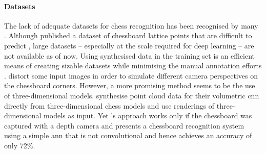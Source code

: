 \documentclass[../../main.tex]{subfiles}
\begin{document}
\paragraph{Datasets}
The lack of adequate datasets for chess recognition has been recognised by many \cite{czyzewski2020,ding2016,mehta2020}.
Although \textcite{czyzewski2020} published a dataset of chessboard lattice points that are difficult to predict \cite{czyzewski2018}, large datasets -- especially at the scale required for deep learning -- are not available as of now.
Using synthesised data in the training set is an efficient means of creating sizable datasets while minimising the manual annotation efforts \cite{wei2017,hou,czyzewski2020}.
\citeauthor{czyzewski2020} distort some input images in order to simulate different camera perspectives on the chessboard corners.
However, a more promising method seems to be the use of three-dimensional models.
\textcite{wei2017} synthesise point cloud data for their volumetric \gls{cnn} directly from three-dimensional chess models and \textcite{hou} use renderings of three-dimensional models as input. 
Yet \textcite{wei2017}'s approach works only if the chessboard was captured with a depth camera and \textcite{hou} presents a chessboard recognition system using a simple \gls{ann} that is not convolutional and hence achieves an accuracy of only 72\%.
\end{document}
